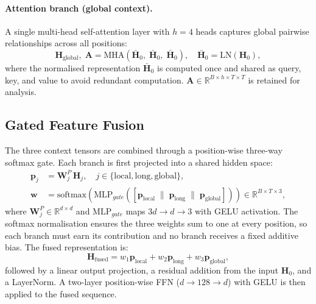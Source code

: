 \documentclass[runningheads]{llncs}
\begin{document}
\paragraph{Attention branch (global context).}
A single multi-head self-attention layer with $h=4$ heads captures global
pairwise relationships across all positions:
\begin{equation}
  \mathbf{H}_{\text{global}}, \;\mathbf{A}
    = \text{MHA}\!\left(\bar{\mathbf{H}}_0,\;
                        \bar{\mathbf{H}}_0,\;
                        \bar{\mathbf{H}}_0\right),
  \quad \bar{\mathbf{H}}_0 = \text{LN}(\mathbf{H}_0),
  \label{eq:attention}
\end{equation}
where the normalised representation $\bar{\mathbf{H}}_0$ is computed once and
shared as query, key, and value to avoid redundant computation.
$\mathbf{A} \in \mathbb{R}^{B \times h \times T \times T}$ is retained for
analysis.

\subsection{Gated Feature Fusion}
\label{sec:fusion}

The three context tensors are combined through a position-wise three-way softmax
gate.  Each branch is first projected into a shared hidden space:
\begin{align}
  \mathbf{p}_j &= \mathbf{W}_j^P\, \mathbf{H}_j, \quad j \in
    \{\text{local}, \text{long}, \text{global}\}, \\
  \mathbf{w} &= \text{softmax}\!\left(
    \text{MLP}_{gate}\!\left(
      [\mathbf{p}_{\text{local}} \;\|\; \mathbf{p}_{\text{long}}
       \;\|\; \mathbf{p}_{\text{global}}]
    \right)
  \right) \in \mathbb{R}^{B \times T \times 3},
  \label{eq:gate}
\end{align}
where $\mathbf{W}_j^P \in \mathbb{R}^{d \times d}$ and $\text{MLP}_{gate}$
maps $3d \to d \to 3$ with GELU activation.  The softmax normalisation ensures
the three weights sum to one at every position, so each branch must earn its
contribution and no branch receives a fixed additive bias.  The fused
representation is:
\begin{equation}
  \mathbf{H}_{\text{fused}} =
    w_1 \mathbf{p}_{\text{local}}
    + w_2 \mathbf{p}_{\text{long}}
    + w_3 \mathbf{p}_{\text{global}},
  \label{eq:fused}
\end{equation}
followed by a linear output projection, a residual addition from the input
$\mathbf{H}_0$, and a LayerNorm.  A two-layer position-wise FFN ($d \to 128
\to d$) with GELU is then applied to the fused sequence.
\end{document}

